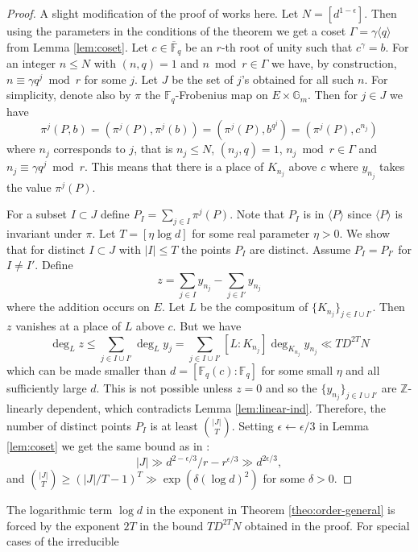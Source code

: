 \documentclass[11pt]{article}
\theoremstyle{plain}
\theoremstyle{definition}
\newcommand{\ang}[1]{\langle#1\rangle}
\newcommand{\abs}[1]{\left\vert#1\right\vert}
\def\Z{\ensuremath{\mathbb{Z}}}
\def\F{\ensuremath{\mathbb{F}}}
\begin{document}
\begin{proof}
	A slight modification of the proof of \cite[Theorem 1.1]{voloch2010} works here. Let $N = [d^{1 
	- \epsilon}]$. Then using the parameters in the conditions of the theorem we get a coset 
	$\Gamma = \gamma \ang{q}$ from Lemma \ref{lem:coset}. Let $c \in \overline{\F}_q$ be an $r$-th 
	root of unity such that $c^\gamma = b$. For an integer $n \le N$ with $(n , q) = 1$ and $n 
	\bmod r \in \Gamma$ we have, by construction, $n \equiv \gamma q^j \bmod r$ for some $j$. Let 
	$J$ be the set of $j$'s obtained for all such $n$. For simplicity, denote also by $\pi$ the 
	$\F_q$-Frobenius map on $E \times \mathbb{G}_m$. Then for $j \in J$ we have
	\[ \pi^j(P, b) = (\pi^j(P), \pi^j(b)) = (\pi^j(P), b^{q^j}) = (\pi^j(P), c^{n_j}) \]
	where $n_j$ corresponds to $j$, that is $n_j \le N$, $(n_j, q) = 1$, $n_j \bmod r \in 
	\Gamma$ and $n_j \equiv \gamma q^j \bmod r$. This means that there is a place of $K_{n_j}$ above 
	$c$ where $y_{n_j}$ takes the value $\pi^j(P)$. 
	
	For a subset $I \subset J$ define $P_I = \sum_{j \in I}\pi^j(P)$. Note that $P_I$ is in 
	$\ang{P}$ since $\ang{P}$ is invariant under $\pi$. Let $T = [\eta \log d]$ for some real 
	parameter $\eta > 0$. We show that for distinct $I \subset J$ with $\abs{I} \le T$ the points 
	$P_I$ are distinct. Assume $P_I = P_{I'}$ for $I \ne I'$. Define  
	\[ z = \sum_{j \in I}y_{n_j} - \sum_{j \in I'}y_{n_j} \]
	where the addition occurs on $E$. Let $L$ be the compositum of $\{ K_{n_j} \}_{j \in I \cup 
	I'}$. Then $z$ vanishes at a place of $L$ above $c$. But we have
	\[ \deg_L z \le \sum_{j \in I \cup I'} \deg_L y_j = \sum_{j \in I \cup I'} [L : K_{n_j}] 
	\deg_{K_{n_j}} y_{n_j} \ll TD^{2T}N \] 
	which can be made smaller than $d = [\F_q(c) : \F_q]$ for some small $\eta$ and all 
	sufficiently large $d$. This is not possible unless $z = 0$ and so the $ \{ y_{n_j} \}_{j \in I 
	\cup I'}$ are $\Z$-linearly dependent, which contradicts Lemma \ref{lem:linear-ind}. Therefore, 
	the number of distinct points $P_I$ is at least $\binom{\abs{J}}{T}$. Setting $\epsilon 
	\leftarrow \epsilon / 3$ in Lemma \ref{lem:coset} we get the same bound as in \cite{voloch2007}:
	\[ \abs{J} \gg d^{2 - \epsilon / 3} / r - r^{\epsilon / 3} \gg d^{2\epsilon / 3}, \]
	and $\binom{\abs{J}}{T} \ge (\abs{J} / T - 1)^T \gg \exp(\delta (\log d)^2)$ for some $\delta > 
	0$.
\end{proof}
The logarithmic term $\log d$ in the exponent in Theorem \ref{theo:order-general} is forced by the 
exponent $2T$ in the bound $TD^{2T}N$ obtained in the proof. For special cases of the irreducible 
\end{document}
